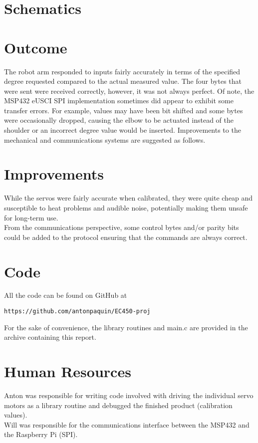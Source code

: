 \documentclass[10pt]{article}
\begin{document}
\section{Schematics}

\section{Outcome}

The robot arm responded to inputs fairly accurately in terms of the specified degree requested compared to the actual measured value. The four bytes that were sent were received correctly, however, it was not always perfect. Of note, the MSP432 eUSCI SPI implementation sometimes did appear to exhibit some transfer errors. For example, values may have been bit shifted and some bytes were occasionally dropped, causing the elbow to be actuated instead of the shoulder or an incorrect degree value would be inserted. Improvements to the mechanical and communications systems are suggested as follows.

\section{Improvements}
While the servos were fairly accurate when calibrated, they were quite cheap and susceptible to heat problems and audible noise, potentially making them unsafe for long-term use. \\ \newline
From the communications perspective, some control bytes and/or parity bits could be added to the protocol ensuring that the commands are always correct.
\section{Code}


All the code can be found on GitHub at 
\begin{lstlisting}
https://github.com/antonpaquin/EC450-proj
\end{lstlisting}
For the sake of convenience, the library routines and main.c are provided in the archive containing this report.

\section{Human Resources}
Anton was responsible for writing code involved with driving the individual servo motors as a library routine and debugged the finished product (calibration values).\\ \newline 
Will was responsible for the communications interface between the MSP432 and the Raspberry Pi (SPI).
\end{document}
